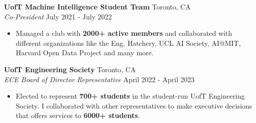 \documentclass[a4paper]{article}
\begin{document}
\textbf{UofT Machine Intelligence Student Team} \hfill Toronto, CA\\
\textit{Co-President} \hfill July 2021 - July 2022\\
\vspace{-3mm}
\begin{itemize} \itemsep 0.5pt
	\item Managed a club with \textbf{2000+ active members} and collaborated with different organizations like the Eng. Hatchery, UCL AI Society, AI@MIT, Harvard Open Data Project and many more.
\end{itemize}

\textbf{UofT Engineering Society} \hfill Toronto, CA\\
\textit{ECE Board of Director Representative} \hfill April 2022 - April 2023\\
\vspace{-3pt}
\begin{itemize}
	\item Elected to represent \textbf{700+ students} in the student-run UofT Engineering Society. I collaborated with other representatives to make executive decisions that offers services to \textbf{6000+ students}.
\end{itemize}
\end{document}
